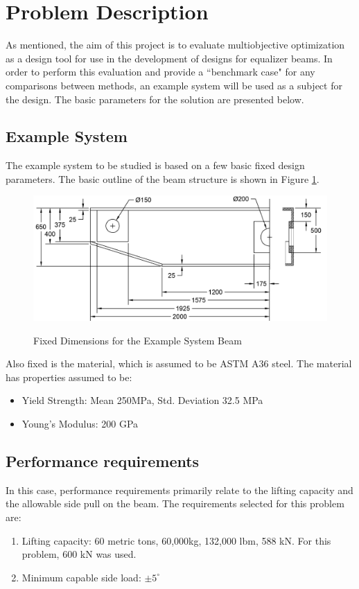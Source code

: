 \section{Problem Description}
As mentioned, the aim of this project is to evaluate multiobjective optimization as a design tool for use in the development of designs for equalizer beams. In order to perform this evaluation and provide a ``benchmark case" for any comparisons between methods, an example system will be used as a subject for the design. The basic parameters for the solution are presented below. 

\subsection{Example System}
\label{sec:beam_des}
The example system to be studied is based on a few basic fixed design parameters. The basic outline of the beam structure is shown in Figure \ref{img:dim_beam}. 

\begin{figure}
\includegraphics[width=\textwidth]{img/dim_beam.png}
	\label{img:dim_beam}
	\caption{Fixed Dimensions for the Example System Beam}
\end{figure}

Also fixed is the material, which is assumed to be ASTM A36 steel. The material has properties assumed to be: 

\begin{itemize}
\item Yield Strength: Mean 250MPa, Std. Deviation 32.5 MPa
\item Young's Modulus: 200 GPa
\end{itemize}

\subsection{Performance requirements}
In this case, performance requirements primarily relate to the lifting capacity and the allowable side pull on the beam. The requirements selected for this problem are: 
\begin{enumerate}
\item Lifting capacity: 60 metric tons, 60,000kg, 132,000 lbm, 588 kN. For this problem, 600 kN was used. 
\item Minimum capable side load: $\pm 5^{\circ} $
\end{enumerate}

